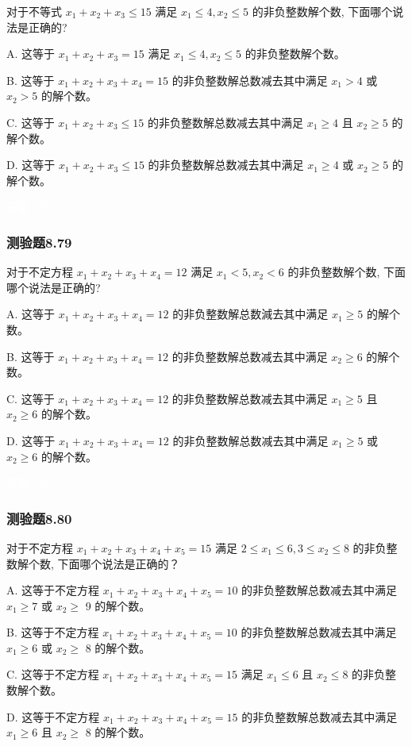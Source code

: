 \documentclass[UTF8, heading=true]{ctexart}
\begin{document}
对于不等式 $x_1+x_2+x_3 \leq 15$ 满足 $x_1 \leq 4, x_2 \leq 5$ 的非负整数解个数, 下面哪个说法是正确的?

A. 这等于 $x_1+x_2+x_3=15$ 满足 $x_1 \leq 4, x_2 \leq 5$ 的非负整数解个数。

B. 这等于 $x_1+x_2+x_3+x_4=15$ 的非负整数解总数减去其中满足 $x_1>4$ 或 $x_2>5$ 的解个数。

C. 这等于 $x_1+x_2+x_3 \leq 15$ 的非负整数解总数减去其中满足 $x_1 \geq 4$ 且 $x_2 \geq 5$ 的解个数。

D. 这等于 $x_1+x_2+x_3 \leq 15$ 的非负整数解总数减去其中满足 $x_1 \geq 4$ 或 $x_2 \geq 5$ 的解个数。

\textcolor{white}{答案：B}

\subsubsection{测验题8.79}

对于不定方程 $x_1+x_2+x_3+x_4=12$ 满足 $x_1<5, x_2<6$ 的非负整数解个数, 下面哪个说法是正确的?

A. 这等于 $x_1+x_2+x_3+x_4=12$ 的非负整数解总数減去其中满足 $x_1 \geq 5$ 的解个数。

B. 这等于 $x_1+x_2+x_3+x_4=12$ 的非负整数解总数减去其中满足 $x_2 \geq 6$ 的解个数。

C. 这等于 $x_1+x_2+x_3+x_4=12$ 的非负整数解总数减去其中满足 $x_1 \geq 5$ 且 $x_2 \geq 6$ 的解个数。

D. 这等于 $x_1+x_2+x_3+x_4=12$ 的非负整数解总数减去其中满足 $x_1 \geq 5$ 或 $x_2 \geq 6$ 的解个数。

\textcolor{white}{答案：D}

\subsubsection{测验题8.80}

对于不定方程 $x_1+x_2+x_3+x_4+x_5=15$ 满足 $2 \leq x_1 \leq 6,3 \leq x_2 \leq 8$ 的非负整数解个数, 下面哪个说法是正确的？

A. 
这等于不定方程 $x_1+x_2+x_3+x_4+x_5=10$ 的非负整数解总数减去其中满足 $x_1 \geq 7$ 或 $x_2 \geq$ 9 的解个数。

B. 
这等于不定方程 $x_1+x_2+x_3+x_4+x_5=10$ 的非负整数解总数减去其中满足 $x_1 \geq 6$ 或 $x_2 \geq$ 8 的解个数。

C. 这等于不定方程 $x_1+x_2+x_3+x_4+x_5=15$ 满足 $x_1 \leq 6$ 且 $x_2 \leq 8$ 的非负整数解个数。

D. 这等于不定方程 $x_1+x_2+x_3+x_4+x_5=15$ 的非负整数解总数减去其中满足 $x_1 \geq 6$ 且 $x_2 \geq$ 8 的解个数。
\end{document}
